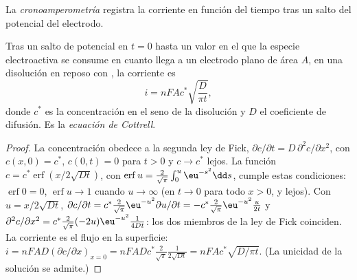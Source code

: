 \begin{definition}[Cronoamperometría]\label{def:b3:electrode-kinetics:chronoamperometry}
La \emph{cronoamperometría} registra la corriente en función del tiempo
tras un salto del potencial del electrodo.
\end{definition}

\begin{theorem}\label{thm:b3:electrode-kinetics:cottrell}
Tras un salto de potencial en $t = 0$ hasta un valor en el que la especie electroactiva se
consume en cuanto llega a un electrodo plano de área $A$, en una disolución en
reposo con , la corriente es
\[
  i = nFAc^*\sqrt{\frac{D}{\pi t}},
\]
donde $c^*$ es la concentración en el seno de la disolución y $D$ el coeficiente de difusión. Es
la \emph{ecuación de Cottrell}.
\end{theorem}

\begin{proof}
La concentración obedece a la segunda ley de Fick, $\partial c/\partial t = D\,\partial^2c/\partial x^2$, con $c(x, 0) = c^*$,
$c(0, t) = 0$ para $t > 0$ y $c \to c^*$ lejos. La función $c = c^*\operatorname{erf}(x/2\sqrt{Dt})$, con
$\operatorname{erf}u = \frac{2}{\sqrt\pi}\int_0^u\eu^{-s^2}\dd s$, cumple estas condiciones: $\operatorname{erf}0 = 0$, $\operatorname{erf}u \to 1$ cuando $u \to \infty$
(en $t \to 0$ para todo $x > 0$, y lejos). Con $u = x/2\sqrt{Dt}$,
$\partial c/\partial t = c^*\frac{2}{\sqrt\pi}\eu^{-u^2}\partial u/\partial t = -c^*\frac{2}{\sqrt\pi}\eu^{-u^2}\frac{u}{2t}$ y $\partial^2c/\partial x^2 = c^*\frac{2}{\sqrt\pi}(-2u)\eu^{-u^2}\frac{1}{4Dt}$: los
dos miembros de la ley de Fick coinciden. La corriente es el flujo en la superficie: $i =
nFAD(\partial c/\partial x)_{x = 0} = nFADc^*\frac{2}{\sqrt\pi}\frac{1}{2\sqrt{Dt}} = nFAc^*\sqrt{D/\pi t}$. (La unicidad de la solución se
admite.)
\end{proof}

